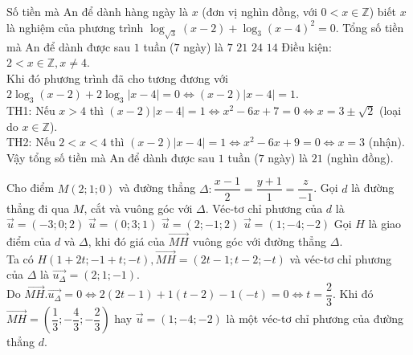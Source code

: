 \begin{ex}%
Số tiền mà An để dành hàng ngày là $x$ (đơn vị nghìn đồng, với $0<x\in\mathbb{Z}$) biết $x$ là nghiệm của phương trình $\log_{\sqrt{3}}(x-2)+\log_3(x-4)^2=0$. Tổng số tiền mà An để dành được sau $1$ tuần ($7$ ngày) là
\choice
{$7$}
{\True $21$}
{$24$}
{$14$}
\loigiai
{Điều kiện: $2<x\in\mathbb{Z}, x\neq 4$.\\Khi đó phương trình đã cho tương đương với $2\log_3(x-2)+2\log_3|x-4|=0\Leftrightarrow (x-2)|x-4|=1$.\\
TH1: Nếu $x>4$ thì $(x-2)|x-4|=1\Leftrightarrow x^2-6x+7=0\Leftrightarrow x=3\pm\sqrt{2}$ (loại do $x\in\mathbb{Z}$).\\
TH2: Nếu $2<x<4$ thì $(x-2)|x-4|=1\Leftrightarrow x^2-6x+9=0\Leftrightarrow x=3$ (nhận).\\Vậy tổng số tiền mà An để dành được sau $1$ tuần ($7$ ngày) là $21$ (nghìn đồng).
 }
\end{ex}

\begin{ex}%
Cho điểm $M(2;1;0)$ và đường thẳng $\Delta:\dfrac{x-1}{2}=\dfrac{y+1}{1}=\dfrac{z}{-1}$. Gọi $d$ là đường thẳng đi qua $M$, cắt và vuông góc với $\Delta$. Véc-tơ chỉ phương của $d$ là
\choice
{$\vec{u}=(-3;0;2)$}
{$\vec{u}=(0;3;1)$}
{$\vec{u}=(2;-1;2)$}
{\True $\vec{u}=(1;-4;-2)$}
\loigiai
{Gọi $H$ là giao điểm của $d$ và $\Delta$, khi đó giá của $\vec{MH}$ vuông góc với đường thẳng $\Delta$.\\
Ta có $H\left(1+2t; -1+t;-t\right), \vec{MH}=(2t-1;t-2;-t)$ và véc-tơ chỉ phương của $\Delta$ là $\vec{u_{\Delta}}=(2;1;-1)$.\\
Do $\vec{MH}.\vec{u_{\Delta}}=0\Leftrightarrow 2(2t-1)+1(t-2)-1(-t)=0\Leftrightarrow t=\dfrac{2}{3}$. Khi đó $\vec{MH}=\left(\dfrac{1}{3};-\dfrac{4}{3};-\dfrac{2}{3}\right)$ hay $\vec{u}=(1;-4;-2)$ là một véc-tơ chỉ phương của đường thẳng $d$.
}
\end{ex}

